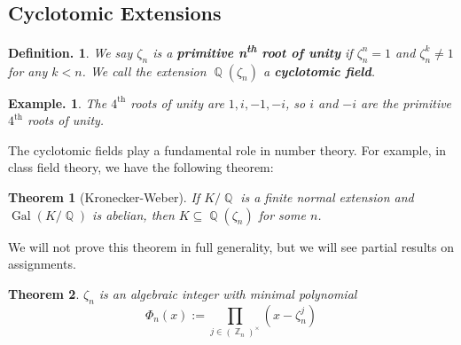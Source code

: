 \documentclass[11pt, a4paper]{memoir}
\DeclareMathOperator{\Q}{{\mathbb{Q}}}
\DeclareMathOperator{\Z}{{\mathbb{Z}}}
\theoremstyle{change}
\newtheorem{theorem}{Theorem}[section]
\theoremstyle{plain}
\theoremstyle{nonumberplain}
\newtheorem{definition}{Definition.}
\newtheorem{example}{Example.}
\DeclareMathOperator{\Gal}{Gal}
\begin{document}
\subsection{Cyclotomic Extensions}
\begin{definition}
    We say $\zeta_n$ is a \textbf{primitive n\textsuperscript{th} root of unity} if $\zeta_n^n=1$ and $\zeta_n^k\neq 1$ for any $k<n$.
    We call the extension $\Q(\zeta_n)$ a \textbf{cyclotomic field}.
\end{definition}
\begin{example}
    The $4^\text{th}$ roots of unity are $1,i,-1,-i$, so $i$ and $-i$ are the primitive $4^\text{th}$ roots of unity.
\end{example}
The cyclotomic fields play a fundamental role in number theory.
For example, in class field theory, we have the following theorem:
\begin{theorem}[Kronecker-Weber]
    If $K/\Q$ is a finite normal extension and $\Gal(K/\Q)$ is abelian, then $K\subseteq\Q(\zeta_n)$ for some $n$.
\end{theorem}
We will not prove this theorem in full generality, but we will see partial results on assignments.
\begin{theorem}
    $\zeta_n$ is an algebraic integer with minimal polynomial
    \begin{equation*}
        \Phi_n(x):=\prod_{j\in(\Z_n)^\times}(x-\zeta_n^j)
    \end{equation*}
\end{theorem}
\end{document}
